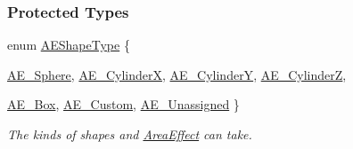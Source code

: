 \subsubsection*{Protected Types}
\begin{DoxyCompactItemize}
\item 
enum \hyperlink{classphys_1_1AreaEffect_a99b8746c43eac266d48ad613110dc6f9}{AEShapeType} \{ \par
\hyperlink{classphys_1_1AreaEffect_a99b8746c43eac266d48ad613110dc6f9a607185bf8c230fe2c39df9d96bd66a09}{AE\_\-Sphere}, 
\hyperlink{classphys_1_1AreaEffect_a99b8746c43eac266d48ad613110dc6f9a623ebbf1c726ad947a74aff5d36d3b8f}{AE\_\-CylinderX}, 
\hyperlink{classphys_1_1AreaEffect_a99b8746c43eac266d48ad613110dc6f9a363e015e6e77fb2f74b63e5dd687a981}{AE\_\-CylinderY}, 
\hyperlink{classphys_1_1AreaEffect_a99b8746c43eac266d48ad613110dc6f9a001df4767697c5c30d2c7b4f318301ba}{AE\_\-CylinderZ}, 
\par
\hyperlink{classphys_1_1AreaEffect_a99b8746c43eac266d48ad613110dc6f9a579014c1569b6129ee8b2cf74e3a14e4}{AE\_\-Box}, 
\hyperlink{classphys_1_1AreaEffect_a99b8746c43eac266d48ad613110dc6f9a1c411d786f32da69b69e6f8dae26f977}{AE\_\-Custom}, 
\hyperlink{classphys_1_1AreaEffect_a99b8746c43eac266d48ad613110dc6f9a9eef62b75d698ff6ef4e74bd2a2df132}{AE\_\-Unassigned}
 \}
\begin{DoxyCompactList}\small\item\em The kinds of shapes and \hyperlink{classphys_1_1AreaEffect}{AreaEffect} can take. \item\end{DoxyCompactList}\end{DoxyCompactItemize}
